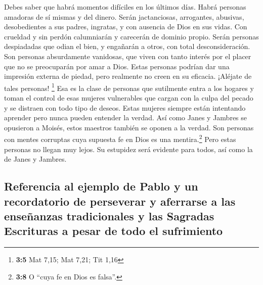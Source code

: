  Debes saber que habrá momentos difíciles en los últimos
días.  Habrá personas amadoras de sí mismas y del dinero.
Serán jactanciosas, arrogantes, abusivas, desobedientes a sus padres,
ingratas, y con ausencia de Dios en sus vidas.  Con
crueldad y sin perdón calumniarán y carecerán de dominio propio. Serán
personas despiadadas que odian el bien,  y engañarán a
otros, con total desconsideración. Son personas absurdamente vanidosas,
que viven con tanto interés por el placer que no se preocuparán por amar
a Dios.  Estas personas podrían dar una impresión externa
de piedad, pero realmente no creen en su eficacia. ¡Aléjate de tales
personas! \footnote{\textbf{3:5} Mat 7,15; Mat 7,21; Tit 1,16}
 Esa es la clase de personas que sutilmente entra a los
hogares y toman el control de esas mujeres vulnerables que cargan con la
culpa del pecado y se distraen con todo tipo de deseos. 
Estas mujeres siempre están intentando aprender pero nunca pueden
entender la verdad.  Así como Janes y Jambres se opusieron
a Moisés, estos maestros también se oponen a la verdad. Son personas con
mentes corruptas cuya supuesta fe en Dios es una mentira.\footnote{\textbf{3:8}
  O ``cuya fe en Dios es falsa''.}  Pero estas personas no
llegan muy lejos. Su estupidez será evidente para todos, así como la de
Janes y Jambres.

\hypertarget{referencia-al-ejemplo-de-pablo-y-un-recordatorio-de-perseverar-y-aferrarse-a-las-enseuxf1anzas-tradicionales-y-las-sagradas-escrituras-a-pesar-de-todo-el-sufrimiento}{%
\subsection{Referencia al ejemplo de Pablo y un recordatorio de
perseverar y aferrarse a las enseñanzas tradicionales y las Sagradas
Escrituras a pesar de todo el
sufrimiento}\label{referencia-al-ejemplo-de-pablo-y-un-recordatorio-de-perseverar-y-aferrarse-a-las-enseuxf1anzas-tradicionales-y-las-sagradas-escrituras-a-pesar-de-todo-el-sufrimiento}}

